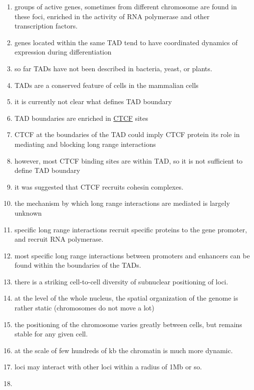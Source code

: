 \documentclass[12pt]{book}
\begin{document}
\begin{enumerate}
\item groups of active genes, sometimes from different chromosome are found in these foci, enriched in the activity of RNA polymerase and other transcription factors.
\item genes located within the same TAD tend to have coordinated dynamics of expression during differentiation
\item so far TADs have not been described in bacteria, yeast, or plants. 
\item TADs are a conserved feature of cells in the mammalian cells
\item it is currently not clear what defines TAD boundary 
\item TAD boundaries are enriched in \href{http://en.wikipedia.org/wiki/CTCF}{CTCF} sites
\item CTCF at the boundaries of the TAD could imply CTCF protein its role in mediating and blocking long range interactions
\item however, most CTCF binding sites are within TAD, so it is not sufficient to define TAD boundary \cite{nora2012spatial}
\item it was suggested that CTCF recruits cohesin complexes.
\item the mechanism by which long range interactions are mediated is largely unknown
\item specific long range interactions recruit specific proteins to the gene promoter, and recruit RNA polymerase. 
\item most specific long range interactions between promoters and enhancers can be found within the boundaries of the TADs. 
\item there is a striking cell-to-cell diversity of subnuclear positioning of loci. 
\item at the level of the whole nucleus, the spatial organization of the genome is rather static (chromosomes do not move a lot) 
\item the positioning of the chromosome varies greatly between cells, but remains stable for any given cell. 
\item at the scale of few hundreds of kb the chromatin is much more dynamic. 
\item loci may interact with other loci within a radius of 1Mb or so. 
\item 


 
\end{enumerate}



\end{document}
